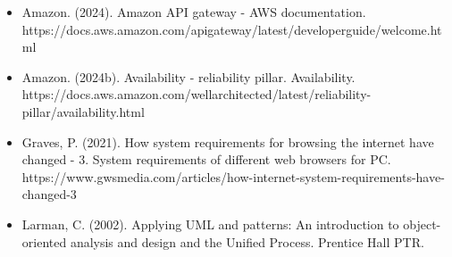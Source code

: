 \begin{itemize}
    \item Amazon. (2024). Amazon API gateway - AWS documentation. https://docs.aws.amazon.com/apigateway/latest/developerguide/welcome.html
    \item Amazon. (2024b). Availability - reliability pillar. Availability. https://docs.aws.amazon.com/wellarchitected/latest/reliability-pillar/availability.html 
    \item Graves, P. (2021). How system requirements for browsing the internet have changed - 3. System requirements of different web browsers for PC. https://www.gwsmedia.com/articles/how-internet-system-requirements-have-changed-3 
    \item Larman, C. (2002). Applying UML and patterns: An introduction to object-oriented analysis and design and the Unified Process. Prentice Hall PTR. 
\end{itemize}
